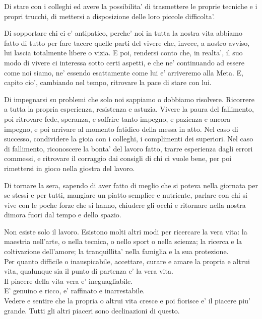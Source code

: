 Di stare con i colleghi ed avere la possibilita' di trasmettere le proprie tecniche e i propri trucchi, di mettersi a disposizione delle loro piccole difficolta'.

Di sopportare chi ci e' antipatico, perche' noi in tutta la nostra vita abbiamo fatto di tutto per fare tacere quelle parti del vivere che, invece, a nostro avviso, lui lascia totalmente libere o vizia. E poi, rendersi conto che, in realta', il suo modo di vivere ci interessa sotto certi aspetti, e che ne' continuando ad essere come noi siamo, ne' essendo esattamente come lui e' arriveremo alla Meta. E, capito cio', cambiando nel tempo, ritrovare la pace di stare con lui.

Di impegnarsi su problemi che solo noi sappiamo o dobbiamo risolvere. Ricorrere a tutta la propria esperienza, resistenza e astuzia. Vivere la paura del fallimento, poi ritrovare fede, speranza, e soffrire tanto impegno, e pazienza e ancora impegno, e poi arrivare al momento fatidico della messa in atto. Nel caso di successo, condividere la gioia con i colleghi, i complimenti dei superiori. Nel caso di fallimento, riconoscere la bonta' del lavoro fatto, trarre esperienza dagli errori commessi, e ritrovare il corraggio dai consigli di chi ci vuole bene, per poi rimettersi in gioco nella giostra del lavoro.

Di tornare la sera, sapendo di aver fatto di meglio che si poteva nella giornata per se stessi e per tutti, mangiare un piatto semplice e nutriente, parlare con chi si vive con le poche forze che si hanno, chiudere gli occhi e ritornare nella nostra dimora fuori dal tempo e dello spazio.

Non esiste solo il lavoro. Esistono molti altri modi per ricercare la vera vita: la maestria nell'arte, o nella tecnica, o nello sport o nella scienza; la ricerca e la coltivazione dell'amore; la tranquillita' nella famiglia e la sua protezione.\\

Per quanto difficile o inauspicabile, accettare, curare e amare la propria e altrui vita, qualunque sia il punto di partenza e' la vera vita.\\

Il piacere della vita vera e' ineguagliabile.\\
E' genuino e ricco, e' raffinato e inarrestabile.\\

Vedere e sentire che la propria o altrui vita cresce e poi fiorisce e' il piacere piu' grande.
Tutti gli altri piaceri sono declinazioni di questo.\\

